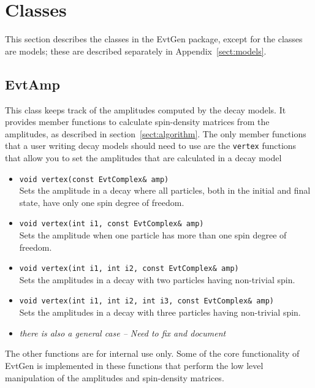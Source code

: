 \section{Classes}
\label{sec:classes}
This section describes the classes in the EvtGen package,
except for the classes are models; these are described 
separately in Appendix~\ref{sect:models}.


\subsection{EvtAmp}

This class keeps track of the amplitudes computed by the decay models. It provides 
member functions to calculate spin-density matrices from the amplitudes,
as described in section~\ref{sect:algorithm}.
The only member functions that a user writing decay models should 
need to use are the {\tt vertex} functions that allow you to
set the amplitudes that are calculated in a decay model

\begin{itemize}
\item {\tt void vertex(const EvtComplex\& amp)}\\
      Sets the amplitude in a decay where all particles, both
      in the initial and final state, have only one spin degree of 
      freedom.

\item {\tt void vertex(int i1, const EvtComplex\& amp)}\\
      Sets the amplitude when one particle has more than
      one spin degree of freedom.

\item {\tt void vertex(int i1, int i2, const EvtComplex\& amp)}\\
      Sets the amplitudes in a decay with two particles having
      non-trivial spin.

\item {\tt void vertex(int i1, int i2, int i3, const EvtComplex\& amp)}\\
      Sets the amplitudes in a decay with three particles having
      non-trivial spin.

\item {\it there is also a general case -- Need to fix and document}
\end{itemize}

The other functions are for internal use only. Some of the core
functionality of EvtGen is implemented in these functions
that perform the low level manipulation of the amplitudes and spin-density matrices.

